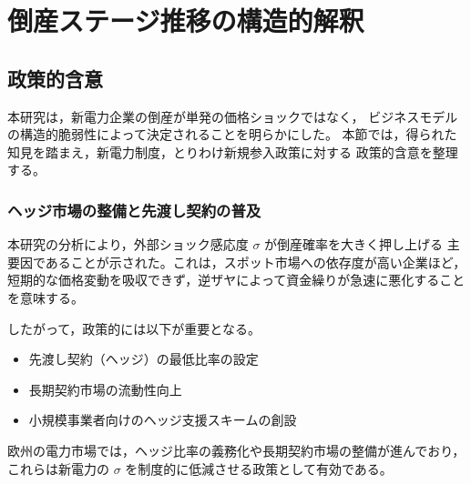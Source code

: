 




\chapter{倒産ステージ推移の構造的解釈}
\label{chap:discussion}


\section{政策的含意}

本研究は，新電力企業の倒産が単発の価格ショックではなく，
ビジネスモデルの構造的脆弱性によって決定されることを明らかにした。
本節では，得られた知見を踏まえ，新電力制度，とりわけ新規参入政策に対する
政策的含意を整理する。

\subsection{ヘッジ市場の整備と先渡し契約の普及}

本研究の分析により，外部ショック感応度 $\sigma$ が倒産確率を大きく押し上げる
主要因であることが示された。これは，スポット市場への依存度が高い企業ほど，
短期的な価格変動を吸収できず，逆ザヤによって資金繰りが急速に悪化することを意味する。

したがって，政策的には以下が重要となる。

\begin{itemize}
    \item 先渡し契約（ヘッジ）の最低比率の設定
    \item 長期契約市場の流動性向上
    \item 小規模事業者向けのヘッジ支援スキームの創設
\end{itemize}

欧州の電力市場では，ヘッジ比率の義務化や長期契約市場の整備が進んでおり，
これらは新電力の $\sigma$ を制度的に低減させる政策として有効である。


